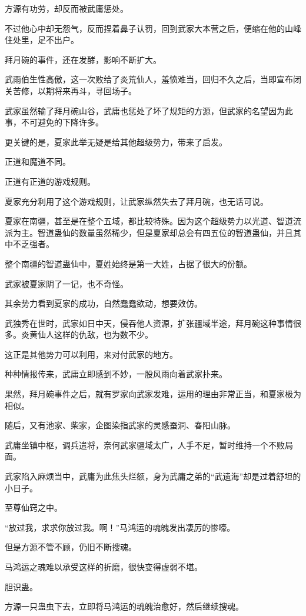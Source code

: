 \begin{this_body}
方源有功劳，却反而被武庸惩处。

不过他心中却无怨气，反而捏着鼻子认罚，回到武家大本营之后，便缩在他的山峰住处里，足不出户。

拜月碗的事件，还在发酵，影响不断扩大。

武雨伯生性高傲，这一次败给了炎荒仙人，羞愤难当，回归不久之后，当即宣布闭关苦修，以期将来再斗，寻回场子。

武家虽然输了拜月碗山谷，武庸也惩处了坏了规矩的方源，但武家的名望因为此事，不可避免的下降许多。

更关键的是，夏家此举无疑是给其他超级势力，带来了启发。

正道和魔道不同。

正道有正道的游戏规则。

夏家充分利用了这个游戏规则，让武家纵然失去了拜月碗，也无话可说。

夏家在南疆，甚至是在整个五域，都比较特殊。因为这个超级势力以光道、智道流派为主。智道蛊仙的数量虽然稀少，但是夏家却总会有四五位的智道蛊仙，并且其中不乏强者。

整个南疆的智道蛊仙中，夏姓始终是第一大姓，占据了很大的份额。

武家被夏家阴了一记，也不奇怪。

其余势力看到夏家的成功，自然蠢蠢欲动，想要效仿。

武独秀在世时，武家如日中天，侵吞他人资源，扩张疆域半途，拜月碗这种事情很多。炎黄仙人这样的仇敌，也为数不少。

这正是其他势力可以利用，来对付武家的地方。

种种情报传来，武庸立即感到不妙，一股风雨向着武家扑来。

果然，拜月碗事件之后，就有罗家向武家发难，运用的理由非常正当，和夏家极为相似。

随后，又有池家、柴家，企图染指武家的灵感蚕洞、春阳山脉。

武庸坐镇中枢，调兵遣将，奈何武家疆域太广，人手不足，暂时维持一个不败局面。

武家陷入麻烦当中，武庸为此焦头烂额，身为武庸之弟的“武遗海”却是过着舒坦的小日子。

至尊仙窍之中。

“放过我，求求你放过我。啊！”马鸿运的魂魄发出凄厉的惨嚎。

但是方源不管不顾，仍旧不断搜魂。

马鸿运之魂难以承受这样的折磨，很快变得虚弱不堪。

胆识蛊。

方源一只蛊虫下去，立即将马鸿运的魂魄治愈好，然后继续搜魂。


\end{this_body}
